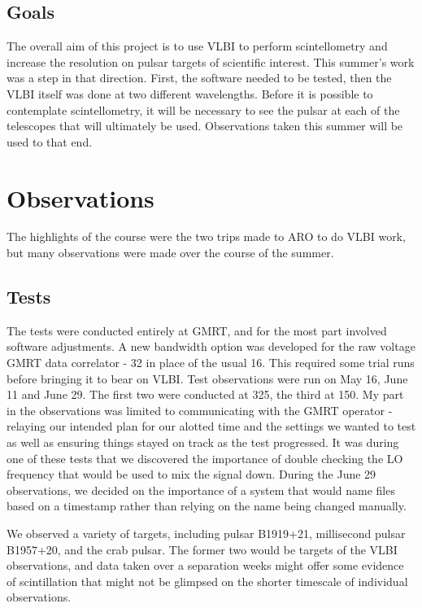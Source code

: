 \documentclass[a4paper,12pt]{article}
\begin{document}
\subsection{Goals}
\label{sec:goals}

The overall aim of this project is to use VLBI to perform scintellometry and increase the resolution on pulsar targets of scientific interest. This summer’s work was a step in that direction. First, the software needed to be tested, then the VLBI itself was done at two different wavelengths. Before it is possible to contemplate scintellometry, it will be necessary to see the pulsar at each of the telescopes that will ultimately be used. Observations taken this summer will be used to that end.


\section{Observations}
\label{observations}
The highlights of the course were the two trips made to ARO to do VLBI work, but many observations were made over the course of the summer.

\subsection{Tests}
\label{tests}
The tests were conducted entirely at GMRT, and for the most part involved software adjustments. A new bandwidth option was developed for the raw voltage GMRT data correlator - \unit{32}{\mega\hertz} in place of the usual 16. This required some trial runs before bringing it to bear on VLBI. Test observations were run on May 16, June 11 and June 29. The first two were conducted at \unit{325}{\mega\hertz}, the third at \unit{150}{\mega\hertz}. My part in the observations was limited to communicating with the GMRT operator - relaying our intended plan for our alotted time and the settings we wanted to test as well as ensuring things stayed on track as the test progressed. It was during one of these tests that we discovered the importance of double checking the LO frequency that would be used to mix the signal down. During the June 29 observations, we decided on the importance of a system that would name files based on a timestamp rather than relying on the name being changed manually. 

We observed a variety of targets, including pulsar B1919+21, millisecond pulsar B1957+20, and the crab pulsar. The former two would be targets of the VLBI observations, and data taken over a separation weeks might offer some evidence of scintillation that might not be glimpsed on the shorter timescale of individual observations.
\end{document}
